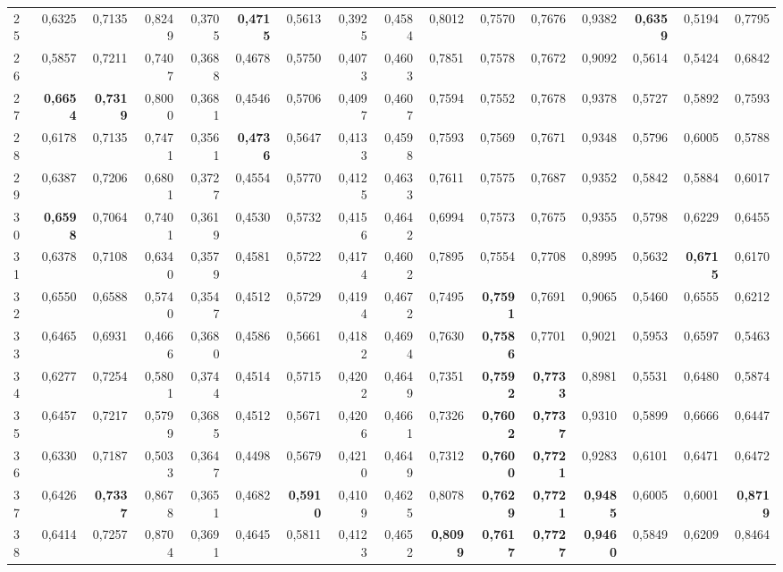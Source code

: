 \begin{table}[htp!]
\begin{adjustwidth}{-2cm}{}
\begin{tabular}{ l | *{15}{| r}}
25	&	0,6325	&	0,7135	&	0,8249	&	0,3705	&	\textbf{0,4715}	&	0,5613	&	0,3925	&	0,4584	&	0,8012	&	0,7570	&	0,7676	&	0,9382	&	\textbf{0,6359}	&	0,5194	&	0,7795	\\
26	&	0,5857	&	0,7211	&	0,7407	&	0,3688	&	0,4678	&	0,5750	&	0,4073	&	0,4603	&	0,7851	&	0,7578	&	0,7672	&	0,9092	&	0,5614	&	0,5424	&	0,6842	\\
27	&	\textbf{0,6654}	&	\textbf{0,7319}	&	0,8000	&	0,3681	&	0,4546	&	0,5706	&	0,4097	&	0,4607	&	0,7594	&	0,7552	&	0,7678	&	0,9378	&	0,5727	&	0,5892	&	0,7593	\\
28	&	0,6178	&	0,7135	&	0,7471	&	0,3561	&	\textbf{0,4736}	&	0,5647	&	0,4133	&	0,4598	&	0,7593	&	0,7569	&	0,7671	&	0,9348	&	0,5796	&	0,6005	&	0,5788	\\
29	&	0,6387	&	0,7206	&	0,6801	&	0,3727	&	0,4554	&	0,5770	&	0,4125	&	0,4633	&	0,7611	&	0,7575	&	0,7687	&	0,9352	&	0,5842	&	0,5884	&	0,6017	\\
30	&	\textbf{0,6598}	&	0,7064	&	0,7401	&	0,3619	&	0,4530	&	0,5732	&	0,4156	&	0,4642	&	0,6994	&	0,7573	&	0,7675	&	0,9355	&	0,5798	&	0,6229	&	0,6455	\\
31	&	0,6378	&	0,7108	&	0,6340	&	0,3579	&	0,4581	&	0,5722	&	0,4174	&	0,4602	&	0,7895	&	0,7554	&	0,7708	&	0,8995	&	0,5632	&	\textbf{0,6715}	&	0,6170	\\
32	&	0,6550	&	0,6588	&	0,5740	&	0,3547	&	0,4512	&	0,5729	&	0,4194	&	0,4672	&	0,7495	&	\textbf{0,7591}	&	0,7691	&	0,9065	&	0,5460	&	0,6555	&	0,6212	\\
33	&	0,6465	&	0,6931	&	0,4666	&	0,3680	&	0,4586	&	0,5661	&	0,4182	&	0,4694	&	0,7630	&	\textbf{0,7586}	&	0,7701	&	0,9021	&	0,5953	&	0,6597	&	0,5463	\\
34	&	0,6277	&	0,7254	&	0,5801	&	0,3744	&	0,4514	&	0,5715	&	0,4202	&	0,4649	&	0,7351	&	\textbf{0,7592}	&	\textbf{0,7733}	&	0,8981	&	0,5531	&	0,6480	&	0,5874	\\
35	&	0,6457	&	0,7217	&	0,5799	&	0,3685	&	0,4512	&	0,5671	&	0,4206	&	0,4661	&	0,7326	&	\textbf{0,7602}	&	\textbf{0,7737}	&	0,9310	&	0,5899	&	0,6666	&	0,6447	\\
36	&	0,6330	&	0,7187	&	0,5033	&	0,3647	&	0,4498	&	0,5679	&	0,4210	&	0,4649	&	0,7312	&	\textbf{0,7600}	&	\textbf{0,7721}	&	0,9283	&	0,6101	&	0,6471	&	0,6472	\\
37	&	0,6426	&	\textbf{0,7337}	&	0,8678	&	0,3651	&	0,4682	&	\textbf{0,5910}	&	0,4109	&	0,4625	&	0,8078	&	\textbf{0,7629}	&	\textbf{0,7721}	&	\textbf{0,9485}	&	0,6005	&	0,6001	&	\textbf{0,8719}	\\
38	&	0,6414	&	0,7257	&	0,8704	&	0,3691	&	0,4645	&	0,5811	&	0,4123	&	0,4652	&	\textbf{0,8099}	&	\textbf{0,7617}	&	\textbf{0,7727}	&	\textbf{0,9460}	&	0,5849	&	0,6209	&	0,8464	\\

\end{tabular}
\end{adjustwidth}
\end{table}

